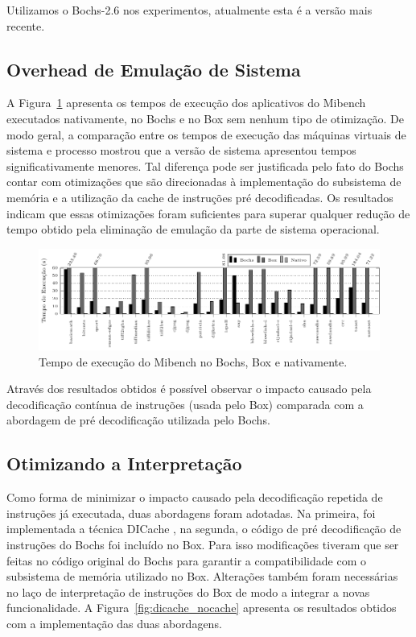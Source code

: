 \documentclass[11pt,twoside]{article}
\begin{document}
Utilizamos o Bochs-2.6 nos experimentos, atualmente esta é a versão mais recente.


\subsection{Overhead de Emulação de Sistema}

A Figura~\ref{fig:bochs_nocache_nativo} apresenta os tempos de execução dos 
aplicativos do Mibench executados nativamente, no Bochs e no Box sem nenhum 
tipo de otimização. De modo geral, a comparação entre os tempos de execução das 
máquinas virtuais de sistema e processo mostrou que a versão de sistema apresentou 
tempos significativamente menores. Tal diferença pode ser justificada pelo fato do
Bochs contar com otimizações que são direcionadas à implementação do subsistema de 
memória e a utilização da cache de instruções pré decodificadas. Os resultados 
indicam que essas otimizações foram suficientes para superar qualquer redução de 
tempo obtido pela eliminação de emulação da parte de sistema operacional. 

\begin{figure}[h]
	\centering
	\includegraphics[width=1.0\textwidth]{figures/bochs_nocache_nativo}
	\caption{Tempo de execução do Mibench no Bochs, Box e nativamente.}
	\label{fig:bochs_nocache_nativo}
\end{figure}

Através dos resultados obtidos é possível observar o impacto causado pela
decodificação contínua de instruções (usada pelo Box) comparada com a 
abordagem de pré decodificação utilizada pelo Bochs.

\subsection{Otimizando a Interpretação}

Como forma de minimizar o impacto causado pela decodificação repetida de
instruções já executada, duas abordagens foram adotadas. Na primeira, foi
implementada a técnica DICache \cite{dicache}, na segunda, o código de
pré decodificação de instruções do Bochs foi incluído no Box. Para isso
modificações tiveram que ser feitas no código original do Bochs para garantir a
compatibilidade com o subsistema de memória utilizado no Box. Alterações também
foram necessárias no laço de interpretação de instruções do Box de modo a
integrar a novas funcionalidade. A Figura~\ref{fig:dicache_nocache} apresenta os
resultados obtidos com a implementação das duas abordagens.
\end{document}
